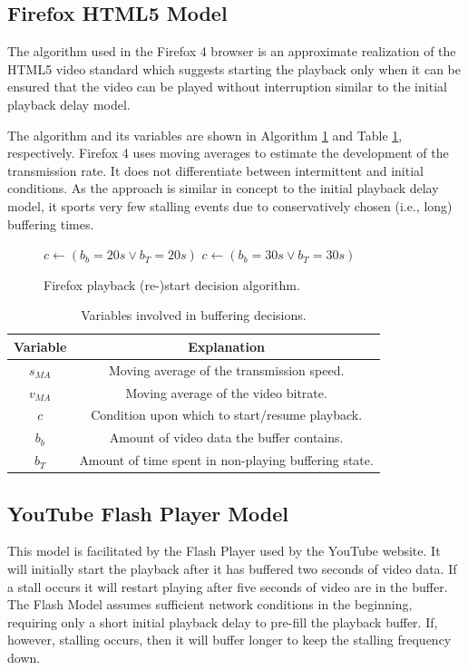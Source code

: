 \subsection{Firefox HTML5 Model}
The algorithm used in the Firefox 4 browser is an approximate realization of the HTML5 video standard \cite{html5} which suggests starting the playback only when it can be ensured that the video can be played without interruption similar to the initial playback delay model.

The algorithm and its variables are shown in Algorithm \ref{c3:alg:firefox-PV} and Table \ref{c3:tbl:buffvars}, respectively. Firefox 4 uses moving averages to estimate the development of the transmission rate. It does not differentiate between intermittent and initial conditions. As the approach is similar in concept to the initial playback delay model, %
it sports very few stalling events due to conservatively chosen (i.e., long) buffering times.



\begin{figure}[htbp]
	\centering
	\begin{algorithmic}
		  \STATE $c \gets ( b_b=20s \lor b_T=20s )$
		\ELSE
		  \STATE $c \gets ( b_b=30s \lor b_T=30s )$
		\ENDIF 
	\end{algorithmic}
	\caption{Firefox playback (re-)start decision algorithm.}
	\label{c3:alg:firefox-PV}
\end{figure}


\begin{table}[htbp]
	\caption{Variables involved in buffering decisions.}
	\label{c3:tbl:buffvars}
	\centering
	\begin{tabular}{|c|c|} \hline
	Variable & Explanation \\ \hline\hline
	$s_{MA}$ & Moving average of the transmission speed. \\ \hline
	$v_{MA}$ & Moving average of the video bitrate. \\ \hline
	$c$   & Condition upon which to start/resume playback. \\ \hline
	$b_b$    & Amount of video data the buffer contains. \\ \hline
	$b_T$    & Amount of time spent in non-playing buffering state. \\ \hline
	\end{tabular}
\end{table}
 
  
\subsection{YouTube Flash Player Model}
This model is facilitated by the Flash Player used by the YouTube website. It will initially start the playback after it has buffered two seconds of video data. If a stall occurs it will restart playing after five seconds of video are in the buffer.
The Flash Model assumes sufficient network conditions in the beginning, requiring only a short initial playback delay to pre-fill the playback buffer. If, however, stalling occurs, then it will buffer longer to keep the stalling frequency down.


